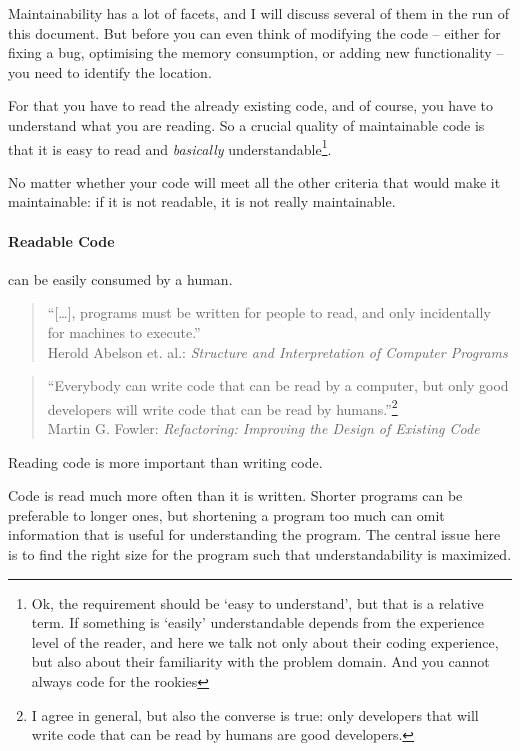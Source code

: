 \documentclass[11pt,a4paper, titlepage, parskip=half, headsepline, footsepline, cleardoublepage=current, headheight=1cm]{scrbook}
\begin{document}
Maintainability has a lot of facets, and I will discuss several of them in the run of this document. But before you can even think of modifying the code – either for fixing a bug, optimising the memory consumption, or adding new functionality – you need to identify the location.  

For that you have to read the already existing code, and of course, you have to understand what you are reading. So a crucial quality of maintainable code is that it is easy to read and \textit{basically} understandable\footnote{Ok, the requirement should be ‘easy to understand’, but that is a relative term. If something is ‘easily’ understandable depends from the experience level of the reader, and here we talk not only about their coding experience, but also about their familiarity with the problem domain. And you cannot always code for the rookies}.

No matter whether your code will meet all the other criteria that would make it maintainable: if it is not readable, it is not really maintainable. 

\paragraph{Readable Code} can be easily consumed by a human.

\begin{quotation}
“[…], programs must be written for people to read, and only incidentally for machines to execute.”\\
Herold Abelson et. al.: \textit{Structure and Interpretation of Computer Programs}
\autocite{Sussman:StructureAndInterpretationOfComputerPrograms}
\end{quotation}

\begin{quotation}
“Everybody can write code that can be read by a computer, but only good developers will write code that can be read by humans.”\footnote{I agree in general, but also the converse is true: only developers that will write code that can be read by humans are good developers.} \\
Martin G. Fowler: \textit{Refactoring: Improving the Design of Existing Code}\autocite{Fowler:Refactoring}
\end{quotation}

Reading code is more important than writing code.\autocite{Marks:LocalVariableTypeInference:ReadingIsMoreImportantThanWriting}

Code is read much more often than it is written. Shorter programs can be preferable to longer ones, but shortening a program too much can omit information that is useful for understanding the program. The central issue here is to find the right size for the program such that understandability is maximized.
\end{document}

